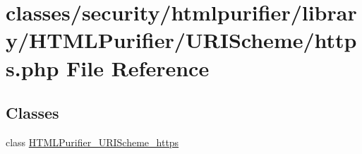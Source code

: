\hypertarget{https_8php}{\section{classes/security/htmlpurifier/library/\+H\+T\+M\+L\+Purifier/\+U\+R\+I\+Scheme/https.php File Reference}
\label{https_8php}
}
\subsection*{Classes}
\begin{DoxyCompactItemize}
\item 
class \hyperlink{classHTMLPurifier__URIScheme__https}{H\+T\+M\+L\+Purifier\+\_\+\+U\+R\+I\+Scheme\+\_\+https}
\end{DoxyCompactItemize}
